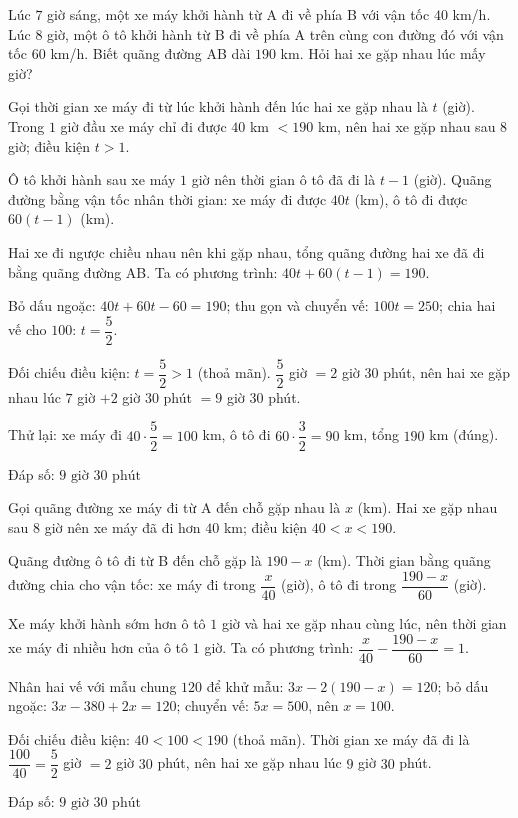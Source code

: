 \begin{problem}[8DS-PT1-017]
Lúc $7$ giờ sáng, một xe máy khởi hành từ A đi về phía B với vận tốc $40$ km/h. Lúc $8$ giờ, một ô tô khởi hành từ B đi về phía A trên cùng con đường đó với vận tốc $60$ km/h. Biết quãng đường AB dài $190$ km. Hỏi hai xe gặp nhau lúc mấy giờ?

\begin{solution}
Gọi thời gian xe máy đi từ lúc khởi hành đến lúc hai xe gặp nhau là $t$ (giờ). Trong $1$ giờ đầu xe máy chỉ đi được $40$ km $< 190$ km, nên hai xe gặp nhau sau $8$ giờ; điều kiện $t > 1$.

Ô tô khởi hành sau xe máy $1$ giờ nên thời gian ô tô đã đi là $t - 1$ (giờ). Quãng đường bằng vận tốc nhân thời gian: xe máy đi được $40t$ (km), ô tô đi được $60(t - 1)$ (km).

Hai xe đi ngược chiều nhau nên khi gặp nhau, tổng quãng đường hai xe đã đi bằng quãng đường AB. Ta có phương trình: $40t + 60(t - 1) = 190$.

Bỏ dấu ngoặc: $40t + 60t - 60 = 190$; thu gọn và chuyển vế: $100t = 250$; chia hai vế cho $100$: $t = \dfrac{5}{2}$.

Đối chiếu điều kiện: $t = \dfrac{5}{2} > 1$ (thoả mãn). $\dfrac{5}{2}$ giờ $= 2$ giờ $30$ phút, nên hai xe gặp nhau lúc $7$ giờ $+ 2$ giờ $30$ phút $= 9$ giờ $30$ phút.

Thử lại: xe máy đi $40 \cdot \dfrac{5}{2} = 100$ km, ô tô đi $60 \cdot \dfrac{3}{2} = 90$ km, tổng $190$ km (đúng).

Đáp số: $\boxed{9 \text{ giờ } 30 \text{ phút}}$
\end{solution}

\begin{solution}
Gọi quãng đường xe máy đi từ A đến chỗ gặp nhau là $x$ (km). Hai xe gặp nhau sau $8$ giờ nên xe máy đã đi hơn $40$ km; điều kiện $40 < x < 190$.

Quãng đường ô tô đi từ B đến chỗ gặp là $190 - x$ (km). Thời gian bằng quãng đường chia cho vận tốc: xe máy đi trong $\dfrac{x}{40}$ (giờ), ô tô đi trong $\dfrac{190 - x}{60}$ (giờ).

Xe máy khởi hành sớm hơn ô tô $1$ giờ và hai xe gặp nhau cùng lúc, nên thời gian xe máy đi nhiều hơn của ô tô $1$ giờ. Ta có phương trình: $\dfrac{x}{40} - \dfrac{190 - x}{60} = 1$.

Nhân hai vế với mẫu chung $120$ để khử mẫu: $3x - 2(190 - x) = 120$; bỏ dấu ngoặc: $3x - 380 + 2x = 120$; chuyển vế: $5x = 500$, nên $x = 100$.

Đối chiếu điều kiện: $40 < 100 < 190$ (thoả mãn). Thời gian xe máy đã đi là $\dfrac{100}{40} = \dfrac{5}{2}$ giờ $= 2$ giờ $30$ phút, nên hai xe gặp nhau lúc $9$ giờ $30$ phút.

Đáp số: $\boxed{9 \text{ giờ } 30 \text{ phút}}$
\end{solution}
\end{problem}

